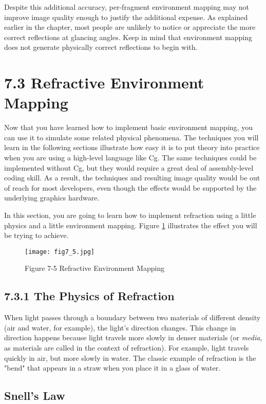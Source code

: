 \documentclass[../main.tex]{subfiles}
\begin{document}
Despite this additional accuracy, per-fragment environment mapping may not improve image quality enough to justify the additional expense. As explained earlier in the chapter, most people are unlikely to notice or appreciate the more correct reflections at glancing angles. Keep in mind that environment mapping does not generate physically correct reflections to begin with.

\section{7.3 Refractive Environment Mapping}

Now that you have learned how to implement basic environment mapping, you can use it to simulate some related physical phenomena. The techniques you will learn in the following sections illustrate how easy it is to put theory into practice when you are using a high-level language like Cg. The same techniques could be implemented without Cg, but they would require a great deal of assembly-level coding skill. As a result, the techniques and resulting image quality would be out of reach for most developers, even though the effects would be supported by the underlying graphics hardware.

In this section, you are going to learn how to implement refraction using a little physics and a little environment mapping. Figure \ref{fig:7-5} illustrates the effect you will be trying to achieve.

\begin{figure}
    \centering
    \texttt{[image: fig7\_5.jpg]}
    \caption{Figure 7-5 Refractive Environment Mapping}
    \label{fig:7-5}
\end{figure}

\subsection{7.3.1 The Physics of Refraction}

When light passes through a boundary between two materials of different density (air and water, for example), the light's direction changes. This change in direction happens because light travels more slowly in denser materials (or \textit{media}, as materials are called in the context of refraction). For example, light travels quickly in air, but more slowly in water. The classic example of refraction is the "bend" that appears in a straw when you place it in a glass of water.

\subsection*{Snell's Law}
\end{document}
